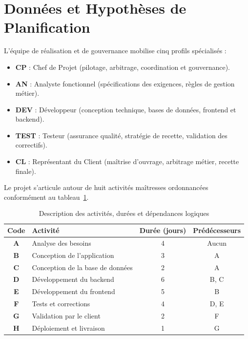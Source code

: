 \documentclass[a4paper,12pt]{report}
\begin{document}
	\section{Données et Hypothèses de Planification}
	L'équipe de réalisation et de gouvernance mobilise cinq profils spécialisés :
	\begin{itemize}[leftmargin=1.2cm, noitemsep]
		\item \textbf{CP} : Chef de Projet (pilotage, arbitrage, coordination et gouvernance).
		\item \textbf{AN} : Analyste fonctionnel (spécifications des exigences, règles de gestion métier).
		\item \textbf{DEV} : Développeur (conception technique, bases de données, frontend et backend).
		\item \textbf{TEST} : Testeur (assurance qualité, stratégie de recette, validation des correctifs).
		\item \textbf{CL} : Représentant du Client (maîtrise d'ouvrage, arbitrage métier, recette finale).
	\end{itemize}
	
	Le projet s'articule autour de huit activités maîtresses ordonnancées conformément au tableau~\ref{tab:donnees_projet}.
	
	\begin{table}[H]
		\centering
		\small
		\caption{Description des activités, durées et dépendances logiques}
		\label{tab:donnees_projet}
		\begin{tabularx}{\textwidth}{c >{\raggedright\arraybackslash}X c c}
			\toprule
			\textbf{Code} & \textbf{Activité} & \textbf{Durée (jours)} & \textbf{Prédécesseurs} \\
			\midrule
			\textbf{A} & Analyse des besoins & 4 & Aucun \\
			\textbf{B} & Conception de l'application & 3 & A \\
			\textbf{C} & Conception de la base de données & 2 & A \\
			\textbf{D} & Développement du backend & 6 & B, C \\
			\textbf{E} & Développement du frontend & 5 & B \\
			\textbf{F} & Tests et corrections & 4 & D, E \\
			\textbf{G} & Validation par le client & 2 & F \\
			\textbf{H} & Déploiement et livraison & 1 & G \\
			\bottomrule
		\end{tabularx}
	\end{table}
	
\end{document}
